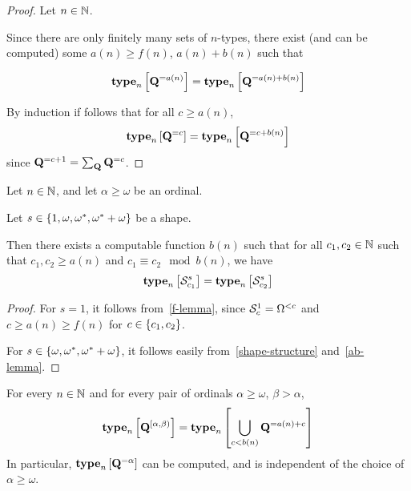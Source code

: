 \begin{proof}
    Let $n \in \mathbb{N}$.

    Since there are only finitely many sets of $n$-types,
    there exist (and can be computed)
    some $a(n) \ge f(n)$, $a(n) + b(n)$ such that

    \[
        \mathbf{type}_{n} \left[ {\mathbf{Q}^{= a(n)}} \right] = \mathbf{type}_{n} \left[ {\mathbf{Q}^{= a(n) + b(n)}} \right]
    \]

    By induction if follows that for all $c \ge a(n)$,
    \[\mathbf{type}_{n} \left[ {\mathbf{Q}^{= c}} \right] = \mathbf{type}_{n} \left[ {\mathbf{Q}^{= c + b(n)}} \right]\]
    since $\mathbf{Q}^{= c + 1} = \sum_{\mathbf{Q}} \mathbf{Q}^{= c}$.
\end{proof}

\begin{corollary}\label{s-alpha-finite}
    Let $n \in \mathbb{N}$, and let $\alpha \ge \omega$ be an ordinal.

    Let $s \in \left\{ {1, \omega, \omega^\ast, \omega^\ast + \omega} \right\}$ be a shape.

    Then there exists a computable function $b(n)$ such that
    for all $c_1, c_2 \in \mathbb{N}$ such that $c_1, c_2 \ge a(n)$ and $c_1 \equiv c_2 \mod b(n)$,
    we have
    \[\mathbf{type}_{n} \left[ {\mathcal{S}^{s}_{c_1}} \right] = \mathbf{type}_{n} \left[ {\mathcal{S}^{s}_{c_2}} \right]\]
\end{corollary}

\begin{proof}
    For $s = 1$, it follows from~\cref{f-lemma},
    since $\mathcal{S}^{1}_{c} = \Omega^{< c}$
    and $c \ge a(n) \ge f(n)$ for $c \in \left\{ {c_1, c_2} \right\}$.

    For $s \in \left\{ {\omega, \omega^\ast, \omega^\ast + \omega} \right\}$, it follows easily from~\cref{shape-structure}
    and~\cref{ab-lemma}.
\end{proof}

\begin{lemma}
    For every $n \in \mathbb{N}$ and for every pair of ordinals $\alpha \ge \omega$,
    $\beta > \alpha$,
    \[
        \mathbf{type}_{n} \left[ {\mathbf{Q}^{[\alpha, \beta)}} \right] = \mathbf{type}_{n} \left[ {\bigcup_{c < b(n)}{\mathbf{Q}^{= a(n) + c}}} \right]
    \]
    In particular, $\mathbf{type}_{n} \left[ {\mathbf{Q}^{= \alpha}} \right]$ can be computed,
    and is independent of the choice of $\alpha \ge \omega$.
\end{lemma}

